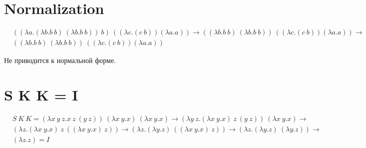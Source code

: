 \documentclass{article}
\begin{document}
\section{Normalization}

\begin{align*}
& ((\lambda a. (\lambda b. b\ b)\ (\lambda b. b\ b))\ b)\ ((\lambda c. (c\ b)) (\lambda a. a))
\rightarrow
((\lambda b. b\ b)\ (\lambda b. b\ b))\ ((\lambda c. (c\ b)) (\lambda a. a)) 
\rightarrow \\
&((\lambda b. b\ b)\ (\lambda b. b\ b))\ ((\lambda c. (c\ b)) (\lambda a. a))
\end{align*}

Не приводится к нормальной форме.

\section{S K K = I}

\begin{align*}
& S\ K\ K = (\lambda x\ y\ z.x\ z\ (y\ z))\ (\lambda x\ y. x)\ (\lambda x\ y. x)
\rightarrow 
(\lambda y\ z.(\lambda x\ y.x)\ z\ (y\ z))\ (\lambda x\ y. x)
\rightarrow \\
&(\lambda z.(\lambda x\ y.x)\ z\ ((\lambda x\ y.x)\ z))
\rightarrow
(\lambda z.(\lambda y.z)\ ((\lambda x\ y.x)\ z))
\rightarrow
(\lambda z.(\lambda y.z)\ (\lambda y.z))
\rightarrow \\
&(\lambda z.z) = I
\end{align*}
\end{document}
